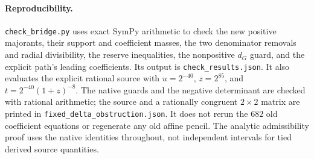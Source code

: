 \documentclass[10pt]{article}
\begin{document}
\paragraph{Reproducibility.}
\texttt{check\_bridge.py} uses exact SymPy arithmetic to check the
new positive majorants, their support and coefficient masses, the
two denominator removals and radial divisibility, the reserve
inequalities, the nonpositive $d_G$ guard, and the explicit path's
leading coefficients. Its output is \texttt{check\_results.json}.
It also evaluates the explicit rational source with
$u=2^{-40}$, $z=2^{85}$, and $t=2^{-40}(1+z)^{-8}$.
The native guards and the negative determinant are checked with rational
arithmetic; the source and a rationally congruent $2\times2$ matrix are
printed in \texttt{fixed\_delta\_obstruction.json}.
It does not rerun the $682$ old coefficient equations or regenerate
any old affine pencil. The analytic admissibility proof uses the
native identities throughout, not independent intervals for tied
derived source quantities.
\end{document}
